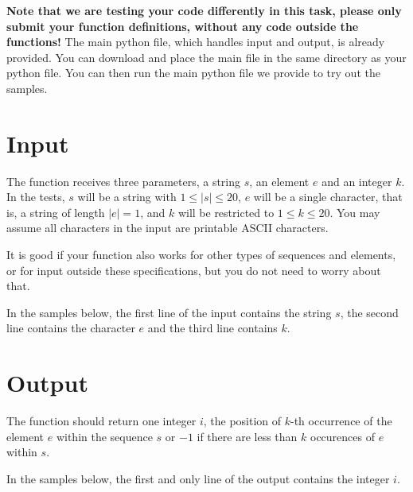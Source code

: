 \textbf{Note that we are testing your code differently in this task,
please only submit your function definitions, without any code outside the functions!}
The main python file, which handles input and output, is already provided.
You can download and place the main file in the same directory as your python file.
You can then run the main python file we provide to try out the samples.

\section*{Input}
The function receives three parameters,
a string $s$, an element $e$ and an integer $k$.
In the tests, $s$ will be a string with $1 \le |s| \le 20$,
$e$ will be a single character, that is, a string of length $|e| = 1$,
and $k$ will be restricted to $1 \le k \le 20$.
You may assume all characters in the input are printable ASCII characters.

It is good if your function also works for other types of sequences and elements,
or for input outside these specifications,
but you do not need to worry about that.

In the samples below,
the first line of the input contains the string $s$,
the second line contains the character $e$
and the third line contains $k$.

\section*{Output}
The function should return one integer $i$,
the position of $k$-th occurrence of the element $e$ within the sequence $s$
or $-1$ if there are less than $k$ occurences of $e$ within $s$.

In the samples below,
the first and only line of the output contains the integer $i$.

